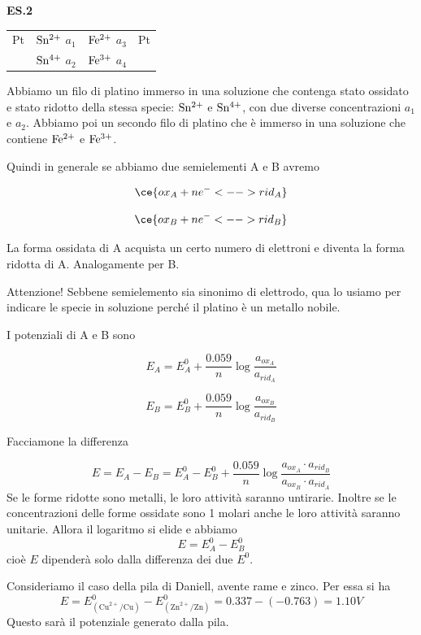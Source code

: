 \vspace{0.2cm}\textbf{ES.2}

\begin{center}
    \begin{tabular}{p{0.6cm}|p{1.6cm}||p{1.6cm}|p{2cm}}
        Pt & $\rm Sn^{2+}$ $a_1$ & $\rm Fe^{2+}$ $a_3$ & Pt\\[0.5ex]
         & $\rm Sn^{4+}$ $a_2$ & $\rm Fe^{3+}$ $a_4$&\\[0.5ex]
    \end{tabular}
\end{center}

Abbiamo un filo di platino immerso in una soluzione che contenga stato ossidato e stato ridotto della stessa specie: $\rm Sn^{2+}$ e $\rm Sn^{4+}$, con due diverse concentrazioni $a_1$ e $a_2$. Abbiamo poi un secondo filo di platino che è immerso in una soluzione che contiene $\rm Fe^{2+}$ e $\rm Fe^{3+}$.

Quindi in generale se abbiamo due semielementi A e B avremo

$$\ce{ox_A + ne^- <--> rid_A}$$

$$\ce{ox_B + ne^- <--> rid_B}$$

La forma ossidata di A acquista un certo numero di elettroni e diventa la forma ridotta di A. Analogamente per B.

Attenzione! Sebbene semielemento sia sinonimo di elettrodo, qua lo usiamo per indicare le specie in soluzione perché il platino è un metallo nobile.

I potenziali di A e B sono

$$E_A = E^0_{A} + \frac{0.059}{n} \log \frac{a_{ox_{A}}}{a_{rid_{A}}}$$

$$E_B = E^0_{B} + \frac{0.059}{n} \log \frac{a_{ox_{B}}}{a_{rid_{B}}}$$

Facciamone la differenza

$$E = E_A - E_B = E^0_{A} - E^0_{B} + \frac{0.059}{n} \log \frac{a_{ox_{A}} \cdot a_{rid_{B}}}{a_{ox_{B}}  \cdot a_{rid_{A}}}$$
Se le forme ridotte sono metalli, le loro attività saranno untirarie. Inoltre se le concentrazioni delle forme ossidate sono 1 molari anche le loro attività saranno unitarie. Allora il logaritmo si elide e abbiamo
$$E=E^0_{A} - E^0_{B}$$
cioè $E$ dipenderà solo dalla differenza dei due $E^0$.

Consideriamo il caso della pila di Daniell, avente rame e zinco. Per essa si ha
$$E=E^0_{(\text{Cu}^{2+}/\text{Cu})} - E^0_{(\text{Zn}^{2+}/\text{Zn})} = 0.337 - (-0.763) = 1.10 V$$
Questo sarà il potenziale generato dalla pila.

